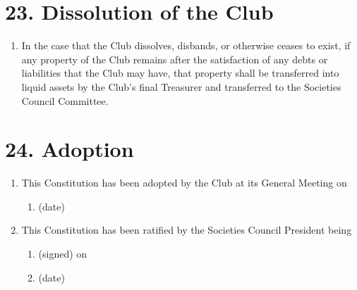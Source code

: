 \documentclass[12pt]{article}
\begin{document}
\section{23. Dissolution of the Club}
\begin{enumerate}[label=23.\arabic*]
 \item In the case that the Club dissolves, disbands, or otherwise ceases to exist, if any property of the Club remains after the satisfaction of any debts or liabilities that the Club may have, that property shall be transferred into liquid assets by the Club’s final Treasurer and transferred to the Societies Council Committee.
\end{enumerate}

\section{24. Adoption}
\begin{enumerate}[label=24.\arabic*]
     \item This Constitution has been adopted by the Club at its General Meeting on
    \begin{enumerate}[label=24.1.\arabic*]
     \item \hspace{1cm} \makebox[3cm]{\hrulefill} (date)
    \end{enumerate}
   \item This Constitution has been ratified by the Societies Council President being
    \begin{enumerate}[label=24.2.\arabic*]
     \item \hspace{1cm} \makebox[3cm]{\hrulefill} (signed) on 
     \item \hspace{1cm} \makebox[3cm]{\hrulefill} (date)
    \end{enumerate}
\end{enumerate}
\end{document}
